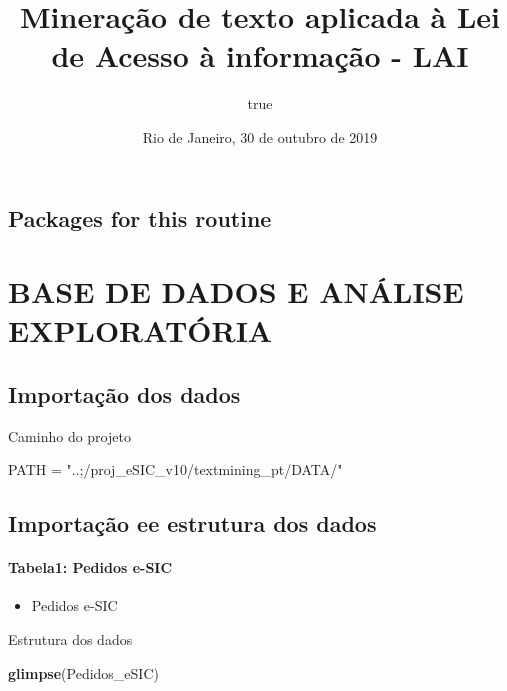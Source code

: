 \documentclass[]{article}
\title{Mineração de texto aplicada à Lei de Acesso à informação - LAI}
\author{true}
\date{Rio de Janeiro, 30 de outubro de 2019}
\newenvironment{Shaded}{\begin{snugshade}}{\end{snugshade}}
\newcommand{\KeywordTok}[1]{\textcolor[rgb]{0.13,0.29,0.53}{\textbf{#1}}}
\newcommand{\NormalTok}[1]{#1}
\newcommand{\StringTok}[1]{\textcolor[rgb]{0.31,0.60,0.02}{#1}}
\providecommand{\tightlist}{%
  \setlength{\itemsep}{0pt}\setlength{\parskip}{0pt}}
\let\oldparagraph\paragraph
\renewcommand{\paragraph}[1]{\oldparagraph{#1}\mbox{}}
\begin{document}
\maketitle

\hypertarget{packages-for-this-routine}{%
\subsection{Packages for this routine}\label{packages-for-this-routine}}

\hypertarget{base-de-dados-e-analise-exploratoria}{%
\section{BASE DE DADOS E ANÁLISE
EXPLORATÓRIA}\label{base-de-dados-e-analise-exploratoria}}

\hypertarget{importacao-dos-dados}{%
\subsection{Importação dos dados}\label{importacao-dos-dados}}

Caminho do projeto

\begin{Shaded}
\begin{Highlighting}[]
\NormalTok{PATH = }\StringTok{"..;/proj_eSIC_v10/textmining_pt/DATA/"}
\end{Highlighting}
\end{Shaded}

\hypertarget{importacao-ee-estrutura-dos-dados}{%
\subsection{Importação ee estrutura dos
dados}\label{importacao-ee-estrutura-dos-dados}}

\hypertarget{tabela1-pedidos-e-sic}{%
\paragraph{Tabela1: Pedidos e-SIC}\label{tabela1-pedidos-e-sic}}

\begin{itemize}
\tightlist
\item
  Pedidos e-SIC
\end{itemize}

Estrutura dos dados

\begin{Shaded}
\begin{Highlighting}[]
\KeywordTok{glimpse}\NormalTok{(Pedidos_eSIC)}
\end{Highlighting}
\end{Shaded}
\end{document}
